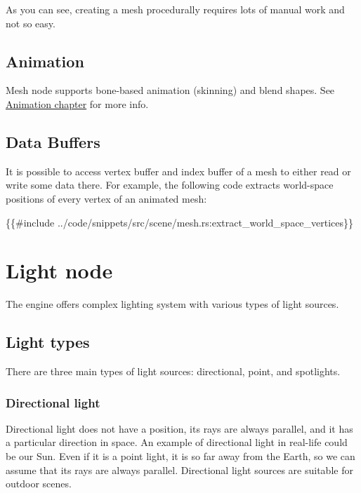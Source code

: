 \documentclass[
]{book}
\newenvironment{Shaded}{\begin{snugshade}}{\end{snugshade}}
\newcommand{\NormalTok}[1]{#1}
\theoremstyle{definition}
\theoremstyle{definition}
\theoremstyle{definition}
\theoremstyle{definition}
\theoremstyle{remark}
\begin{document}
As you can see, creating a mesh procedurally requires lots of manual work and not so easy.

\subsection{Animation}\label{animation-1}

Mesh node supports bone-based animation (skinning) and blend shapes. See \href{./../animation/animation.md}{Animation chapter} for more info.

\subsection{Data Buffers}\label{data-buffers}

It is possible to access vertex buffer and index buffer of a mesh to either read or write some data there. For example, the following code extracts world-space positions of every vertex of an animated mesh:

\begin{Shaded}
\begin{Highlighting}[]
\NormalTok{\{\{\#include ../code/snippets/src/scene/mesh.rs:extract\_world\_space\_vertices\}\}}
\end{Highlighting}
\end{Shaded}

\section{Light node}\label{light-node}

The engine offers complex lighting system with various types of light sources.

\subsection{Light types}\label{light-types}

There are three main types of light sources: directional, point, and spotlights.

\subsubsection{Directional light}\label{directional-light}

Directional light does not have a position, its rays are always parallel, and it has a particular direction in space. An example of directional light in real-life could be our Sun. Even if it is a point light, it is so far away from the Earth, so we can assume that its rays are always parallel. Directional light sources are suitable for outdoor scenes.
\end{document}
